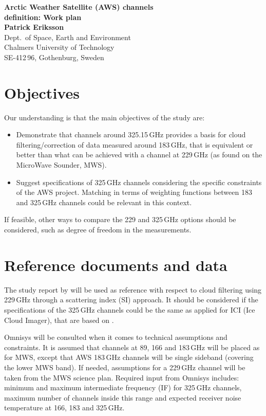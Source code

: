 \documentclass[BCOR=1cm,12pt,bibliography=totoc]{article}
\begin{document}
\noindent
\textbf{{\LARGE Arctic Weather Satellite (AWS) channels\\definition: Work plan}}  \vspace{5mm}\\
{\bf Patrick Eriksson}\\
Dept.\ of Space, Earth and Environment\\
Chalmers University of Technology\\
SE-412\,96, Gothenburg, Sweden \vspace{10mm}


\section{Objectives}
\label{sec:objectives}
%
Our understanding is that the main objectives of the study are:
\begin{itemize}
\item Demonstrate that channels around 325.15\,GHz provides a basis for cloud
  filtering/correction of data measured around 183\,GHz, that is equivalent
  or better than what can be achieved with a channel at 229\,GHz (as found on
  the MicroWave Sounder, MWS). 
\item Suggest specifications of 325\,GHz channels considering the specific
  constraints of the AWS project. Matching in terms of weighting functions between
  183 and 325\,GHz channels could be relevant in this context.
\end{itemize}
If feasible, other ways to compare the 229 and 325\,GHz options should be
considered, such as degree of freedom in the measurements.


\section{Reference documents and data}
\label{sec:info}
%
The study report by \citet{rekha2012potential} will be used as reference with
respect to cloud filtering using 229\,GHz through a scattering index (SI)
approach. It should be considered if the specifications of the 325\,GHz
channels could be the same as applied for ICI (Ice Cloud Imager), that are
based on \citet{buehler:obser:12}.

Omnisys will be consulted when it comes to technical assumptions and
constraints. It is assumed that channels at 89, 166 and 183\,GHz will be placed
as for MWS, except that AWS 183\,GHz channels will be single sideband (covering
the lower MWS band). If needed, assumptions for a 229\,GHz channel will be
taken from the MWS science plan. Required input from Omnisys includes: minimum
and maximum intermediate frequency (IF) for 325\,GHz channels, maximum number
of channels inside this range and expected receiver noise temperature at 166,
183 and 325\,GHz.
\end{document}
